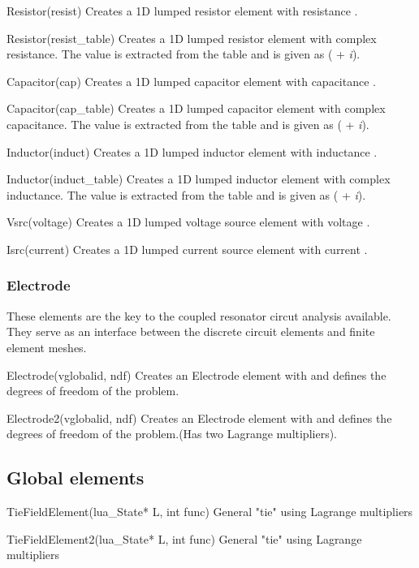 \begin{codelist}

  \item[Resistor(resist)] 
  Creates a 1D lumped resistor element with resistance . 

  \item[Resistor(resist\_table)] 
  Creates a 1D lumped resistor element
  with complex resistance. The value is extracted from the table
   and is given as
  ( + {\it i}).

  \item[Capacitor(cap)]
  Creates a 1D lumped capacitor element with capacitance . 

  \item[Capacitor(cap\_table)]
  Creates a 1D lumped capacitor element
  with complex capacitance. The value is extracted from the table
   and is given as
  ( + {\it i}).

  \item[Inductor(induct)]
  Creates a 1D lumped inductor element with inductance . 

  \item[Inductor(induct\_table)]
  Creates a 1D lumped inductor element
  with complex inductance. The value is extracted from the table
   and is given as
  ( + {\it i}).

  \item[Vsrc(voltage)]
  Creates a 1D lumped voltage source element with voltage . 

  \item[Isrc(current)]
  Creates a 1D lumped current source element with current . 

\end{codelist}
\subsubsection{Electrode}
These elements are the key to the coupled resonator circut analysis 
available. They serve as an interface between the discrete circuit
elements and finite element meshes.
\begin{codelist}
  \item[Electrode(vglobalid, ndf)] Creates an Electrode element 
  with  and  defines the degrees of freedom 
  of the problem.
  \item[Electrode2(vglobalid, ndf)] Creates an Electrode element 
  with  and  defines the degrees of freedom 
  of the problem.(Has two Lagrange multipliers).
\end{codelist}

\subsection{Global elements}
\begin{codelist}
  \item[TieFieldElement(lua\_State* L, int func)] 
  General "tie" using Lagrange multipliers

  \item[TieFieldElement2(lua\_State* L, int func)]
  General "tie" using Lagrange multipliers
\end{codelist}

